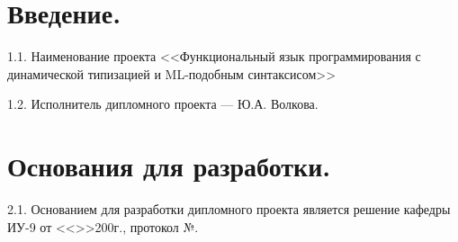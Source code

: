 \documentclass[12pt,a4paper,oneside]{extarticle}
\begin{document}
\clearpage

\section{Введение.}
    1.1. Наименование проекта <<Функциональный язык программирования с динамической типизацией и ML-подобным синтаксисом>>
    
    1.2. Исполнитель дипломного проекта --- Ю.А. Волкова.

\section{Основания для разработки.}
    2.1. Основанием для разработки дипломного проекта является решение кафедры ИУ-9 от <<\underline{\hspace{0.5cm}}>>\underline{\hspace{3cm}}200\underline{\hspace{0.5cm}}г., протокол №\underline{\hspace{0.75cm}}.
\end{document}
